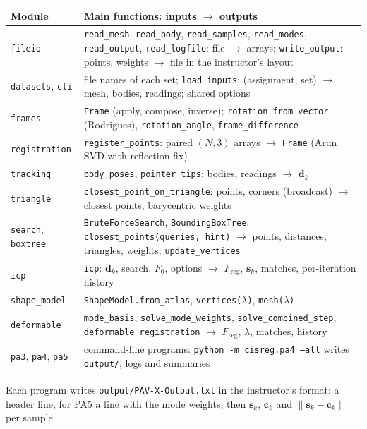 \documentclass[10pt]{article}
\newcommand{\vect}[1]{\mathbf{#1}}
\newcommand{\F}{F_{\mathrm{reg}}}
\begin{document}
\begin{table}[H]
\centering\small
\begin{tabular}{@{}lp{}@{}}
\toprule
Module & Main functions: inputs $\to$ outputs \\
\midrule
\texttt{fileio} & \texttt{read\_mesh}, \texttt{read\_body}, \texttt{read\_samples}, \texttt{read\_modes}, \texttt{read\_output}, \texttt{read\_logfile}: file $\to$ arrays; \texttt{write\_output}: points, weights $\to$ file in the instructor's layout \\
\texttt{datasets}, \texttt{cli} & file names of each set; \texttt{load\_inputs}: (assignment, set) $\to$ mesh, bodies, readings; shared options \\
\texttt{frames} & \texttt{Frame} (apply, compose, inverse); \texttt{rotation\_from\_vector} (Rodrigues), \texttt{rotation\_angle}, \texttt{frame\_difference} \\
\texttt{registration} & \texttt{register\_points}: paired $(N,3)$ arrays $\to$ \texttt{Frame} (Arun SVD with reflection fix) \\
\texttt{tracking} & \texttt{body\_poses}, \texttt{pointer\_tips}: bodies, readings $\to$ $\vect d_k$ \\
\texttt{triangle} & \texttt{closest\_point\_on\_triangle}: points, corners (broadcast) $\to$ closest points, barycentric weights \\
\texttt{search}, \texttt{boxtree} & \texttt{BruteForceSearch}, \texttt{BoundingBoxTree}: \texttt{closest\_points(queries, hint)} $\to$ points, distances, triangles, weights; \texttt{update\_vertices} \\
\texttt{icp} & \texttt{icp}: $\vect d_k$, search, $F_0$, options $\to$ $\F$, $\vect s_k$, matches, per-iteration history \\
\texttt{shape\_model} & \texttt{ShapeModel.from\_atlas}, \texttt{vertices(}$\lambda$\texttt{)}, \texttt{mesh(}$\lambda$\texttt{)} \\
\texttt{deformable} & \texttt{mode\_basis}, \texttt{solve\_mode\_weights}, \texttt{solve\_combined\_step}, \texttt{deformable\_registration} $\to$ $\F$, $\lambda$, matches, history \\
\texttt{pa3}, \texttt{pa4}, \texttt{pa5} & command-line programs: \texttt{python -m cisreg.pa4 --all} writes \texttt{output/}, logs and summaries \\
\bottomrule
\end{tabular}
\end{table}
Each program writes \texttt{output/PAV-X-Output.txt} in the instructor's format: a header line, for PA5 a line with the mode weights, then $\vect s_k$, $\vect c_k$ and $\|\vect s_k-\vect c_k\|$ per sample.
\end{document}
